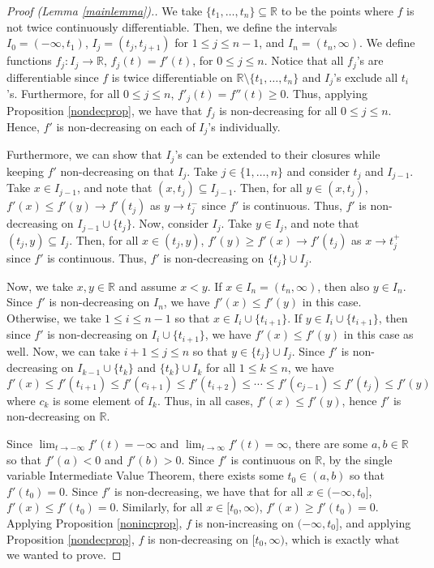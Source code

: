 \documentclass{article}
\newcommand{\R}{\mathbb{R}}
\theoremstyle{plain} %
\numberwithin{thm}{section} %
\theoremstyle{definition} %
\begin{document}
\begin{proof}[Proof (Lemma \ref{mainlemma}).]
We take $\{t_1, \dots, t_n\} \subseteq \R$ to be the points where $f$ is not twice continuously differentiable. Then, we define the intervals $I_0 = (-\infty, t_1)$, $I_j = (t_j, t_{j + 1})$ for $1 \leq j \leq n - 1$, and $I_n = (t_n, \infty)$. We define functions $f_j: I_j \to \R$, $f_j(t) = f'(t)$, for $0 \leq j \leq n$. Notice that all $f_j$'s are differentiable since $f$ is twice differentiable on $\R \setminus \{t_1, \dots, t_n\}$ and $I_j$'s exclude all $t_i$'s. Furthermore, for all $0 \leq j \leq n$, $f'_j(t) = f''(t) \geq 0$. Thus, applying Proposition \ref{nondecprop}, we have that $f_j$ is non-decreasing for all $0 \leq j \leq n$. Hence, $f'$ is non-decreasing on each of $I_j$'s individually.

Furthermore, we can show that $I_j$'s can be extended to their closures while keeping $f'$ non-decreasing on that $I_j$. Take $j \in \{1, \dots, n\}$ and consider $t_j$ and $I_{j - 1}$. Take $x \in I_{j - 1}$, and note that $(x, t_j) \subseteq I_{j - 1}$. Then, for all $y \in (x, t_j)$, $f'(x) \leq f'(y) \to f'(t_j)$ as $y \to t_j^-$ since $f'$ is continuous. Thus, $f'$ is non-decreasing on $I_{j - 1} \cup \{t_j\}$. Now, consider $I_{j}$. Take $y \in I_j$, and note that $(t_j, y) \subseteq I_j$. Then, for all $x \in (t_j, y)$, $f'(y) \geq f'(x) \to f'(t_j)$ as $x \to t_j^+$ since $f'$ is continuous. Thus, $f'$ is non-decreasing on $\{t_j\} \cup I_j$.

Now, we take $x, y \in \R$ and assume $x < y$. If $x \in I_n = (t_n, \infty)$, then also $y \in I_n$. Since $f'$ is non-decreasing on $I_n$, we have $f'(x) \leq f'(y)$ in this case. Otherwise, we take $1 \leq i \leq n - 1$ so that $x \in I_i \cup \{t_{i + 1}\}$. If $y \in I_i \cup \{t_{i + 1}\}$, then  since $f'$ is non-decreasing on $I_{i} \cup \{t_{i + 1}\}$, we have $f'(x) \leq f'(y)$ in this case as well. Now, we can take $i + 1 \leq j \leq n$ so that $y \in \{t_j\} \cup I_j$. Since $f'$ is non-decreasing on $I_{k - 1} \cup \{t_{k}\}$ and $\{t_k\} \cup I_k$ for all $1 \leq k \leq n$, we have 
\[
f'(x) \leq f'(t_{i + 1}) \leq f'(c_{i + 1}) \leq f'(t_{i + 2}) \leq \cdots \leq f'(c_{j - 1}) \leq f'(t_j) \leq f'(y)
\]
where $c_k$ is some element of $I_k$. Thus, in all cases, $f'(x) \leq f'(y)$, hence $f'$ is non-decreasing on $\R$.

Since $\lim_{t \to -\infty}f'(t) = -\infty$ and $\lim_{t \to \infty}f'(t) = \infty$, there are some $a, b \in \R$ so that $f'(a) < 0$ and $f'(b) > 0$. Since $f'$ is continuous on $\R$, by the single variable Intermediate Value Theorem, there exists some $t_0 \in (a, b)$ so that $f'(t_0) = 0$. Since $f'$ is non-decreasing, we have that for all $x \in (-\infty, t_0]$, $f'(x) \leq f'(t_0) = 0$. Similarly, for all $x \in [t_0, \infty)$, $f'(x) \geq f'(t_0) = 0$. Applying Proposition \ref{nonincprop}, $f$ is non-increasing on $(-\infty, t_0]$, and applying Proposition \ref{nondecprop}, $f$ is non-decreasing on $[t_0, \infty)$, which is exactly what we wanted to prove.

\end{proof}
\end{document}
